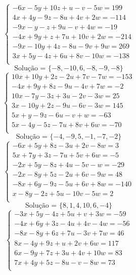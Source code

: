 \documentclass[12pt,oneside,a4paper]{article}
\begin{document}
\vspace{\baselineskip}
\begin{equation*}
\begin{cases}
-6x-5y+10z+u-v-5w=199 \\
4x+4y-9z-8u+4v+2w=-114 \\
-9x-y-z+9u-v+4w=-19 \\
-4x+9y+z+7u+10v+2w=-214 \\
-9x-10y+4z-8u-9v+9w=269 \\
3x+5y-4z+6u+8v-10w=-138 \\
\end{cases}
\end{equation*}
\begin{equation*}
\text{Solução = }\{-8,-10,6,-8,-9,-8\}
\end{equation*}
\vspace{\baselineskip}
\begin{equation*}
\begin{cases}
10x+10y+2z-2u+7v-7w=-153 \\
-4x+9y+8z-9u-4v+7w=-2 \\
10x-7y-3z+3u-2v-3w=25 \\
3x-10y+2z-9u-6v-3w=145 \\
5x+y-9z-6u-v+w=-63 \\
5x-4y-5z-7u+8v+6w=-70 \\
\end{cases}
\end{equation*}
\begin{equation*}
\text{Solução = }\{-4,-9,5,-1,-7,-2\}
\end{equation*}
\vspace{\baselineskip}
\begin{equation*}
\begin{cases}
-6x+5y+8z-3u+2v-8w=3 \\
5x+7y+3z-7u+5v+6w=-5 \\
-2x+5y-8z+4u-5v-w=-29 \\
-2x-8y+5z-2u+6v-9w=48 \\
-8x+6y-9z-5u+6v+8w=-140 \\
x-8y-2z+5u-10v-5w=2 \\
\end{cases}
\end{equation*}
\begin{equation*}
\text{Solução = }\{8,1,4,10,6,-4\}
\end{equation*}
\vspace{\baselineskip}
\begin{equation*}
\begin{cases}
-3x+5y-4z+5u+v+3w=-59 \\
-4x+6y+3z-4u+4v-4w=-56 \\
-8x-8y+6z+7u-3v+7w=46 \\
8x-4y+9z+u+2v+6w=117 \\
6x-9y+7z+3u+4v+10w=83 \\
7x+4y+5z-8u-v-8w=73 \\
\end{cases}
\end{equation*}
\end{document}
